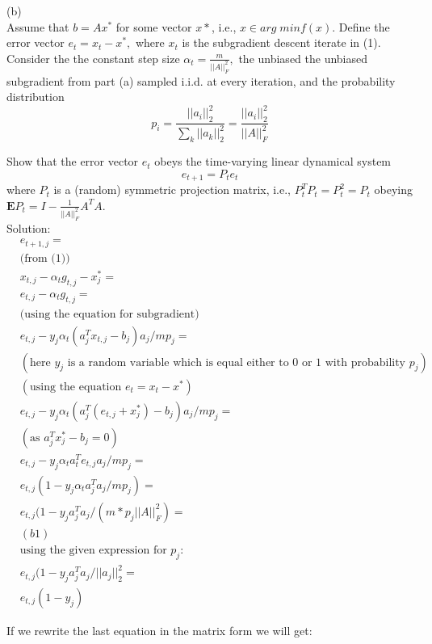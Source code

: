 \documentclass{article}
\begin{document}
(b) \\
Assume that $b = Ax^*$ for some vector $x*$, i.e., 
$x \in arg \; min f(x).$ Define the error vector 
$e_t = x_t - x^*,$ where $x_t$ is the subgradient descent iterate in (1). Consider the the constant step size 
$\alpha_t = \frac{m}{||A||_F^2},$ the unbiased the unbiased subgradient from part
(a) sampled i.i.d. at every iteration, and the probability distribution
$$
p_i = \frac{||a_i||_2^2}{\sum_k ||a_k||_2^2} = \frac{||a_i||_2^2}{||A||_F^2}
$$

Show that the error vector $e_t$ obeys the time-varying linear dynamical system
$$
e_{t+1} = P_t e_t
$$
where $P_t$ is a (random) symmetric projection matrix, i.e., $P_t^T P_t = P_t^2 = P_t$ obeying 
$\mathbf{E}P_t = I - \frac{1}{||A||_F^2} A^T A.$\\

Solution: \\

\begin{align*}
& e_{t+1, j} = \\
& \text{(from (1))}\\
&x_{t,j} - \alpha_t g_{t,j} - x_j^* = \\
& e_{t, j} - \alpha_t g_{t,j} = \\
& \text{(using the equation for subgradient)}\\
& e_{t, j} - y_j \alpha_t (a_j^T x_{t,j} - b_j) a_j / mp_j = \\
& (\text{here } y_j \text{ is a random variable which is 
	equal either to 0 or 1 with probability } p_j)\\
& (\text{using the equation } e_t = x_t - x^*) \\
& e_{t, j} - y_j \alpha_t (a_j^T (e_{t,j} + x^*_j) - b_j) a_j / mp_j = \\
& (\text{as } a_j^T x^*_j - b_j = 0)\\
& e_{t, j} - y_j \alpha_t a_t^T e_{t, j} a_j / mp_j = \\
& e_{t, j}(1 - y_j \alpha_t a^T_j a_j / mp_j) = \\
& e_{t, j}(1 - y_j a^T_j a_j / (m * p_j ||A||_F^2) = \; \\ 
&(b1) \\
& \text{using the given expression for } p_j:\\
& e_{t, j}(1 - y_j a^T_j a_j / ||a_j||_2^2 = \\
&e_{t, j}(1 - y_j)
\end{align*}

If we rewrite the last equation in the matrix form 
we will get:
\end{document}
